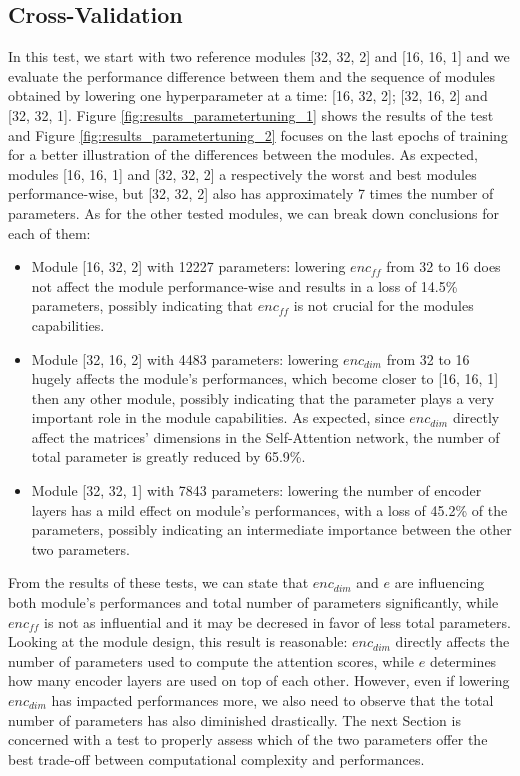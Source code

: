         
        \subsection{Cross-Validation}
            In this test, we start with two reference modules [32, 32, 2] and [16, 16, 1] and we evaluate the performance difference between them and the sequence of modules obtained by lowering one hyperparameter at a time: [16, 32, 2]; [32, 16, 2] and [32, 32, 1]. Figure \ref{fig:results_parametertuning_1} shows the results of the test and Figure \ref{fig:results_parametertuning_2} focuses on the last epochs of training for a better illustration of the differences between the modules. \newline
            As expected, modules [16, 16, 1] and [32, 32, 2] a respectively the worst and best modules performance-wise, but [32, 32, 2] also has approximately 7 times the number of parameters. As for the other tested modules, we can break down conclusions for each of them:
            \begin{itemize}
                \item Module [16, 32, 2] with 12227 parameters: lowering $enc_{ff}$ from 32 to 16 does not affect the module performance-wise and results in a loss of 14.5\% parameters, possibly indicating that $enc_{ff}$ is not crucial for the modules capabilities.
                \item Module [32, 16, 2] with 4483 parameters: lowering $enc_{dim}$ from 32 to 16 hugely affects the module's performances, which become closer to [16, 16, 1] then any other module, possibly indicating that the parameter plays a very important role in the module capabilities. As expected, since $enc_{dim}$ directly affect the matrices' dimensions in the Self-Attention network, the number of total parameter is greatly reduced by 65.9\%.
                \item Module [32, 32, 1] with 7843 parameters: lowering the number of encoder layers has a mild effect on module's performances, with a loss of 45.2\% of the parameters, possibly indicating an intermediate importance between the other two parameters.
            \end{itemize}
            
            From the results of these tests, we can state that $enc_{dim}$ and $e$ are influencing both module's performances and total number of parameters significantly, while $enc_{ff}$ is not as influential and it may be decresed in favor of less total parameters. Looking at the module design, this result is reasonable: $enc_{dim}$ directly affects the number of parameters used to compute the attention scores, while $e$ determines how many encoder layers are used on top of each other. However, even if lowering $enc_{dim}$ has impacted performances more, we also need to observe that the total number of parameters has also diminished drastically. The next Section is concerned with a test to properly assess which of the two parameters offer the best trade-off between computational complexity and performances.
        
